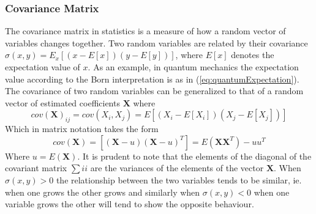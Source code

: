 \subsubsection{Covariance Matrix}
The covariance matrix in statistics is a measure of how a random vector of variables changes together. Two random variables are related by their covariance $\sigma(x,y) = E_x \left[(x-E[x])(y-E[y])\right]$, where $E[x]$ denotes the expectation value of $x$. As an example, in quantum mechanics the expectation value according to the Born interpretation is as in (\ref{eq:quantumExpectation}). The covariance of two random variables can be generalized to that of a random vector of estimated coefficients $\mathbf{X}$ where \cite{covariance}
\begin{equation}
cov(\mathbf{X})_{ij} = cov(X_i,X_j) = E[(X_i-E[X_i])(X_j-E[X_j])]
\end{equation}
Which in matrix notation takes the form 
\begin{equation}
cov(\mathbf{X}) = [(\mathbf{X}- u)(\mathbf{X}-u)^T] = E(\mathbf{X}\mathbf{X}^T) - uu^T
\label{eq:covarianceMatrix}
\end{equation}
Where $u=E(\mathbf{X})$. It is prudent to note that the elements of the diagonal of the covariant matrix $\sum{ii}$ are the variances of the elements of the vector $\mathbf{X}$. When $\sigma(x,y)>0$ the relationship between the two variables tends to be similar, ie. when one grows the other grows and similarly when $\sigma(x,y)<0$ when one variable grows the other will tend to show the opposite behaviour.\cite{covariance}  


